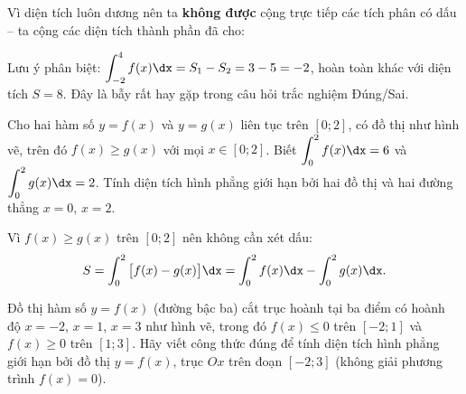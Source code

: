\begin{center}
\end{center}

\begin{loigiai}
Vì diện tích luôn dương nên ta \textbf{không được} cộng trực tiếp các tích phân có dấu -- ta cộng các diện tích thành phần đã cho:
\begin{hopchuy}
Lưu ý phân biệt: $\displaystyle\int_{-2}^{4}f(x)\dx = S_1-S_2=3-5=-2$, hoàn toàn khác với diện tích $S=8$. Đây là bẫy rất hay gặp trong câu hỏi trắc nghiệm Đúng/Sai.
\end{hopchuy}
\end{loigiai}

\begin{hopvidu}
Cho hai hàm số $y=f(x)$ và $y=g(x)$ liên tục trên $[0;2]$, có đồ thị như hình vẽ, trên đó $f(x)\ge g(x)$ với mọi $x\in[0;2]$. Biết $\displaystyle\int_0^2 f(x)\dx=6$ và $\displaystyle\int_0^2 g(x)\dx=2$. Tính diện tích hình phẳng giới hạn bởi hai đồ thị và hai đường thẳng $x=0$, $x=2$.
\end{hopvidu}
\begin{loigiai}
Vì $f(x)\ge g(x)$ trên $[0;2]$ nên không cần xét dấu:
\[
S=\int_0^2\big[f(x)-g(x)\big]\dx = \int_0^2 f(x)\dx - \int_0^2 g(x)\dx.
\]
\end{loigiai}

\begin{hopvidu}
Đồ thị hàm số $y=f(x)$ (đường bậc ba) cắt trục hoành tại ba điểm có hoành độ $x=-2$, $x=1$, $x=3$ như hình vẽ, trong đó $f(x)\le 0$ trên $[-2;1]$ và $f(x)\ge0$ trên $[1;3]$. Hãy viết công thức đúng để tính diện tích hình phẳng giới hạn bởi đồ thị $y=f(x)$, trục $Ox$ trên đoạn $[-2;3]$ (không giải phương trình $f(x)=0$).
\end{hopvidu}

